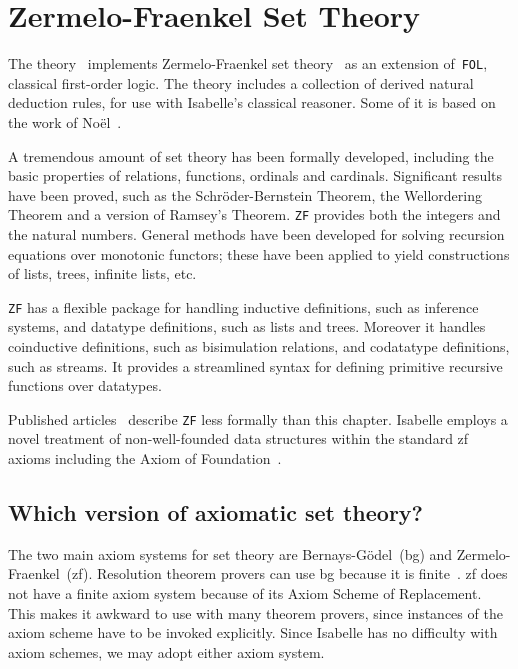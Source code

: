\chapter{Zermelo-Fraenkel Set Theory}

The theory~ implements Zermelo-Fraenkel set
theory~\cite{halmos60,suppes72} as an extension of~\texttt{FOL}, classical
first-order logic.  The theory includes a collection of derived natural
deduction rules, for use with Isabelle's classical reasoner.  Some
of it is based on the work of No\"el~\cite{noel}.

A tremendous amount of set theory has been formally developed, including the
basic properties of relations, functions, ordinals and cardinals.  Significant
results have been proved, such as the Schr\"oder-Bernstein Theorem, the
Wellordering Theorem and a version of Ramsey's Theorem.  \texttt{ZF} provides
both the integers and the natural numbers.  General methods have been
developed for solving recursion equations over monotonic functors; these have
been applied to yield constructions of lists, trees, infinite lists, etc.

\texttt{ZF} has a flexible package for handling inductive definitions,
such as inference systems, and datatype definitions, such as lists and
trees.  Moreover it handles coinductive definitions, such as
bisimulation relations, and codatatype definitions, such as streams.  It
provides a streamlined syntax for defining primitive recursive functions over
datatypes. 

Published articles~\cite{paulson-set-I,paulson-set-II} describe \texttt{ZF}
less formally than this chapter.  Isabelle employs a novel treatment of
non-well-founded data structures within the standard {\sc zf} axioms including
the Axiom of Foundation~\cite{paulson-mscs}.


\section{Which version of axiomatic set theory?}
The two main axiom systems for set theory are Bernays-G\"odel~({\sc bg})
and Zermelo-Fraenkel~({\sc zf}).  Resolution theorem provers can use {\sc
  bg} because it is finite~\cite{boyer86,quaife92}.  {\sc zf} does not
have a finite axiom system because of its Axiom Scheme of Replacement.
This makes it awkward to use with many theorem provers, since instances
of the axiom scheme have to be invoked explicitly.  Since Isabelle has no
difficulty with axiom schemes, we may adopt either axiom system.

